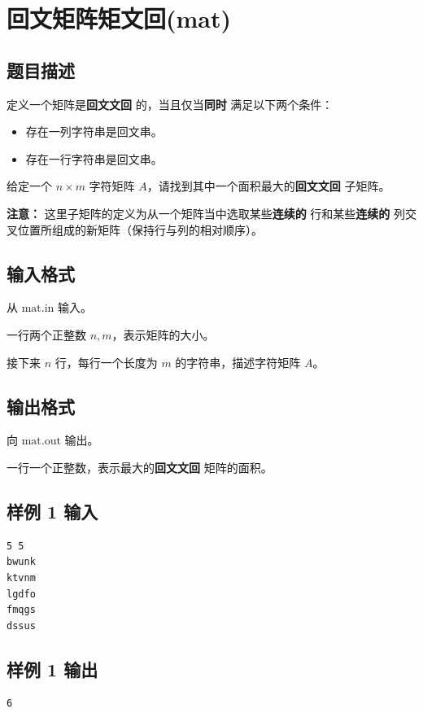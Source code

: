 \documentclass[12pt,a4paper,oneside]{ctexart}
\newcommand{\ChineseprobB}{回文矩阵矩文回}
\newcommand{\probB}{mat}
\begin{document}
  \section{\rm \ChineseprobB (\probB)}
  \subsection*{题目描述}
  
定义一个矩阵是\textbf{回文文回} 的，当且仅当\textbf{同时} 满足以下两个条件：

\begin{itemize}
    \item 存在一列字符串是回文串。
    \item  存在一行字符串是回文串。
\end{itemize}

给定一个 $n \times m$ 字符矩阵 $A$，请找到其中一个面积最大的\textbf{回文文回} 子矩阵。

\textbf{注意：} 这里子矩阵的定义为从一个矩阵当中选取某些\textbf{连续的} 行和某些\textbf{连续的} 列交叉位置所组成的新矩阵（保持行与列的相对顺序）。

  \subsection*{输入格式}
  
从 $\text{mat.in}$ 输入。

  一行两个正整数 $n,m$，表示矩阵的大小。

接下来 $n$ 行，每行一个长度为 $m$ 的字符串，描述字符矩阵 $A$。

  \subsection*{输出格式}
  
向 $\text{mat.out}$ 输出。

  一行一个正整数，表示最大的\textbf{回文文回} 矩阵的面积。

  \subsection*{样例 1 输入}
  \begin{verbatim}
5 5
bwunk
ktvnm
lgdfo
fmqgs
dssus
\end{verbatim}
  \subsection*{样例 1 输出}
  \begin{verbatim}
6
\end{verbatim}
\end{document}
